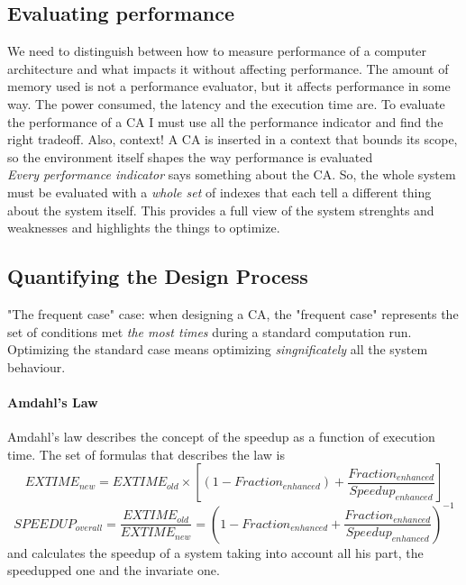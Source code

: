 \documentclass[10pt,a4paper]{article}
\begin{document}
			\subsection{Evaluating performance}
				We need to distinguish between how to measure performance of a computer architecture and what impacts it without affecting performance. The amount of memory used is not a performance evaluator, but it affects performance in some way. The power consumed, the latency and the execution time are. To evaluate the performance of a CA I must use all the performance indicator and find the right tradeoff. Also, context! A CA is inserted in a context that bounds its scope, so the environment itself shapes the way performance is evaluated\\
				\emph{Every performance indicator} says something about the CA. So, the whole system must be evaluated with a \emph{whole set} of indexes that each tell a different thing about the system itself. This provides a full view of the system strenghts and weaknesses and highlights the things to optimize.
				
			\subsection{Quantifying the Design Process}
				"The frequent case" case: when designing a CA, the "frequent case" represents the set of conditions met \emph{the most times} during a standard computation run. Optimizing the standard case means optimizing \emph{singnificately} all the system behaviour. 
				
				\paragraph{Amdahl's Law}
					Amdahl's law describes the concept of the speedup as a function of execution time. The set of formulas that describes the law is
					\begin{equation}
						EXTIME_{new} = EXTIME_{old} \times [(1-Fraction_{enhanced}) + \frac{Fraction_{enhanced}}{Speedup_{enhanced}}]
					\end{equation}
					\begin{equation}
						SPEEDUP_{overall} = \frac{EXTIME_{old}}{EXTIME_{new}} = (1-Fraction_{enhanced} + \frac{Fraction_{enhanced}}{Speedup_{enhanced}})^{-1}
					\end{equation}
					and calculates the speedup of a system taking into account all his part, the speedupped one and the invariate one.\\
			
\end{document}
